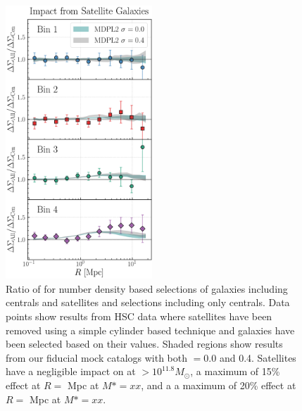 \documentclass[a4paper,fleqn,usenatbib]{mnras}
\begin{document}
  \begin{figure}
      \centering
      \includegraphics[width=0.49\textwidth]{figure/dsigma_sat_ratio}
      \caption{
          Ratio of \dsigma{} for number density based selections of galaxies including centrals
          and satellites and selections including only centrals. Data points show results from
          HSC data where satellites have been removed using a simple cylinder based technique and
          galaxies have been selected based on their \mmax{} values. Shaded regions show results
          from our fiducial mock catalogs with both \sigmh{}$=0.0$ and 0.4. Satellites have a
          negligible impact on \dsigma{} at \mstar{}$> 10^{11.8} M_{\odot}$, a maximum of 15\%
          effect at $R=$ Mpc at $M*=xx$, and a a maximum of 20\% effect at $R=$
          Mpc at $M*=xx$.
          }
      \label{fig:satellite}
  \end{figure}

\end{document}
